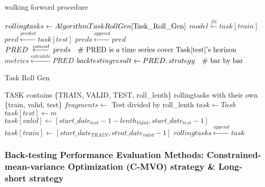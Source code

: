 \documentclass[10pt,letterpaper]{article}
\begin{document}
 \begin{algorithm}
        \caption{walking forward procedure}
        \begin{algorithmic}
            \STATE $rollingtasks \gets Algorithm TaskRollGen\ref{Task_Roll_Gen}$
            \STATE $model \xleftarrow{fit} task[train]$
            \STATE $pred \xleftarrow{predict} task[test]$
            \STATE $preds \xleftarrow{append} pred$
            \ENDFOR
            \STATE $PRED \xleftarrow{concat} preds \text{\quad \# PRED is a time series cover Task[test]'s horizon}$
            \STATE $metrics \xleftarrow{calculate} PRED$
            \STATE $backtestingresult \gets PRED, strategy \text{\quad \# bar by bar}$
        \end{algorithmic}
\end{algorithm}
\begin{algorithm}
	\renewcommand{\algorithmicrequire}{\textbf{Input:}}
	\renewcommand{\algorithmicensure}{\textbf{Output:}}
	\caption{Task Roll Gen}
	\label{Task_Roll_Gen}
	\begin{algorithmic}
    	\REQUIRE TASK contains \{TRAIN, VALID, TEST, roll\_lenth\}
            \ENSURE rollingtasks with their own \{train, valid, test\}
            \STATE $fragments \gets$ Test divided by roll\_lenth
            \STATE $task \gets Task$
            \STATE $task[test] \gets m$
            \STATE $task[valid] \gets [start\_date_{test} - 1 - lenth_{Valid}, start\_date_{test} - 1]$
            \STATE $task[train] \gets [start\_date_{TRAIN}, strat\_date_{valid} - 1]$ 
            \STATE $rollingtasks \xleftarrow{append} task$
            \ENDFOR
	\end{algorithmic}
\end{algorithm}


\subsubsection*{Back-testing Performance Evaluation Methods:  Constrained-mean-variance Optimization (C-MVO) strategy \& Long-short strategy}
\end{document}
